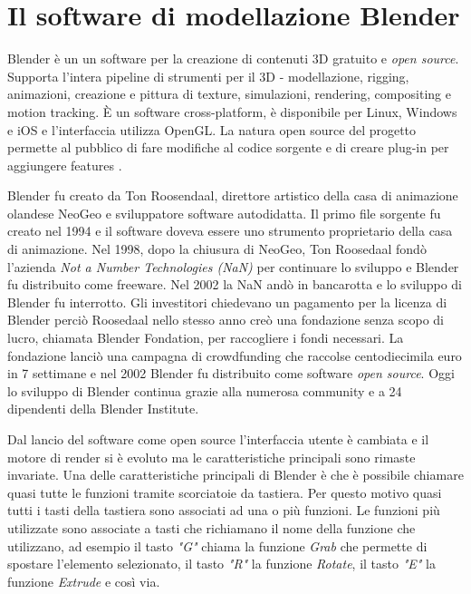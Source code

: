 \section{Il software di modellazione Blender}

Blender è un un software per la creazione di contenuti 3D gratuito e \textit{open source}.
%
Supporta l'intera pipeline di strumenti per il 3D - modellazione, rigging, animazioni, creazione e pittura di texture, simulazioni, rendering, compositing e motion tracking.
%
È un software cross-platform, è disponibile per Linux, Windows e iOS e l'interfaccia utilizza OpenGL.
%
La natura open source del progetto permette al pubblico di fare modifiche al codice sorgente e di creare plug-in per aggiungere features \cite{BlenderAbout}.

Blender fu creato da Ton Roosendaal, direttore artistico della casa di animazione olandese NeoGeo e sviluppatore software autodidatta. 
%
Il primo file sorgente fu creato nel 1994 e il software doveva essere uno strumento proprietario della casa di animazione.
%
Nel 1998, dopo la chiusura di NeoGeo, Ton Roosedaal fondò l'azienda \textit{Not a Number Technologies (NaN)} per continuare lo sviluppo e Blender fu distribuito come freeware. 
%
Nel 2002 la NaN andò in bancarotta e lo sviluppo di Blender fu interrotto.
%
Gli investitori chiedevano un pagamento per la licenza di Blender perciò Roosedaal nello stesso anno creò una fondazione senza scopo di lucro, chiamata Blender Fondation, per raccogliere i fondi necessari.
%
La fondazione lanciò una campagna di crowdfunding che raccolse centodiecimila euro in 7 settimane e nel 2002 Blender fu distribuito come software \textit{open source}.
%
Oggi lo sviluppo di Blender continua grazie alla numerosa community e a 24 dipendenti della Blender Institute.

Dal lancio del software come open source l'interfaccia utente è cambiata e il motore di render si è evoluto ma le caratteristiche principali sono rimaste invariate.
%
Una delle caratteristiche principali di Blender è che è possibile chiamare quasi tutte le funzioni tramite scorciatoie da tastiera. 
%
Per questo motivo quasi tutti i tasti della tastiera sono associati ad una o più funzioni. 
%
Le funzioni più utilizzate sono associate a tasti che richiamano il nome della funzione che utilizzano, ad esempio il tasto \textit{"G"} chiama la funzione \textit{Grab} che permette di spostare l'elemento selezionato, il tasto \textit{"R"} la funzione \textit{Rotate}, il tasto \textit{"E"} la funzione \textit{Extrude} e così via.

